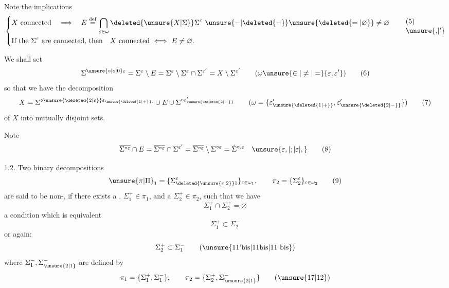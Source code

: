 \begingroup
\makeatletter\tagsleft@true\makeatother
Note the implications
\[
\left\{\begin{aligned}
&X\ \text{connected}\quad\Longrightarrow\quad E\overset{\mathrm{def}}{=}\bigcap_{\varepsilon\in\omega}\deleted{\unsure{X|\Sigma}}\Sigma^\varepsilon\ \unsure{-|\deleted{-}}\unsure{\deleted{=|\varnothing}}\ne\varnothing\\
&\text{If the }\Sigma^\varepsilon\ \text{are connected, then}\quad X\ \text{connected}\ \Longleftrightarrow\ E\ne\varnothing.
\end{aligned}\right.\tag*{\shortstack[l]{(5)\\\unsure{,|'}}}
\]

We shall set
\[
\Sigma^{\unsure{\circ|o|0}\varepsilon}=\Sigma^\varepsilon\setminus E=\Sigma^\varepsilon\setminus\Sigma^\varepsilon\cap\Sigma^{\varepsilon'}=X\setminus\Sigma^{\varepsilon'}\qquad(\omega\unsure{\in|\ne|=}\{\varepsilon,\varepsilon'\})\tag*{(6)}
\]
so that we have the decomposition
\[
X=\Sigma^{\circ\unsure{\deleted{2|\varepsilon}}\varepsilon_{\unsure{\deleted{1|+}}.}}\cup E\cup\Sigma^{\circ\varepsilon'_{\unsure{\deleted{2|-}}}}\qquad(\omega=\{\varepsilon'_{\unsure{\deleted{1|+}}},\varepsilon'_{\unsure{\deleted{2|-}}}\})\tag*{(7)}
\]
of $X$ into  mutually disjoint sets.

Note
\[
\overline{\Sigma^{\circ\varepsilon}}\cap E=\overline{\Sigma^{\circ\varepsilon}}\cap\Sigma^{\varepsilon'}=\overline{\Sigma^{\circ\varepsilon}}\setminus\Sigma^{\circ\varepsilon}=\dot{\Sigma}^{\circ,\varepsilon}\quad\unsure{\varepsilon,|;|\varepsilon|,}\tag*{(8)}
\]

\par
{}

1.2. Two binary decompositions
\[
\unsure{\pi|\Pi}_1=\{\Sigma_{\deleted{\unsure{\varepsilon|2}}1}^\varepsilon\}_{\varepsilon\in\omega_1},\qquad\pi_2=\{\Sigma_2^\varepsilon\}_{\varepsilon\in\omega_2}\tag*{(9)}
\]
are said to be non-\uline{},  if there exists a . $\Sigma_1^+\in\pi_1$, and a $\Sigma_2^+\in\pi_2$, such that we have
\[
\Sigma_1^+\cap\Sigma_2^+=\varnothing\tag*{(10)}
\]
a condition which is equivalent 
\[
\Sigma_1^+\subset\Sigma_2^-\tag*{(11)}
\]
or again:
\[
\Sigma_2^+\subset\Sigma_1^-\tag*{(\unsure{11'bis|11bis|11 bis})}
\]
where $\Sigma_1^-,\Sigma_{\unsure{2|1}}^-$ are defined by
\[
\pi_1=\{\Sigma_1^+,\Sigma_1^-\},\qquad\pi_2=\{\Sigma_2^+,\Sigma_{\unsure{2|1}}^-\}\tag*{(\unsure{17|12})}
\]
\endgroup
